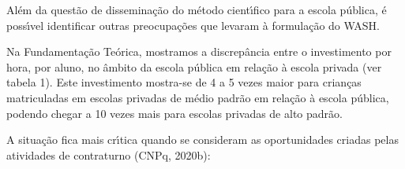 \documentclass[
12pt,		%
openright,	%
twoside,  %
a4paper,			%
chapter=TITLE,		%
english,			%
french,				%
spanish,			%
brazil				%
]{USPSC-classe/USPSC}
\begin{document}
Al\'em da quest\~ao de dissemina\c{c}\~ao do m\'etodo cient\'{\i}fico para a escola p\'ublica, \'e poss\'{\i}vel identificar outras preocupa\c{c}\~oes que levaram \`a formula\c{c}\~ao do WASH.

















Na Fundamenta\c{c}\~ao Te\'orica, mostramos a discrep\^ancia entre o investimento por hora, por aluno, no \^ambito da escola p\'ublica em rela\c{c}\~ao \`a escola privada (ver tabela 1). Este investimento mostra-se de 4 a 5 vezes maior para crian\c{c}as matriculadas em escolas privadas de m\'edio padr\~ao em rela\c{c}\~ao \`a escola p\'ublica, podendo chegar a 10 vezes mais para escolas privadas de alto padr\~ao.

















A situa\c{c}\~ao fica mais cr\'{\i}tica quando se consideram as oportunidades criadas pelas atividades de contraturno  (CNPq, 2020b):


















\noindent\begin{center}\mbox{\centering{}}\end{center}
\end{document}
